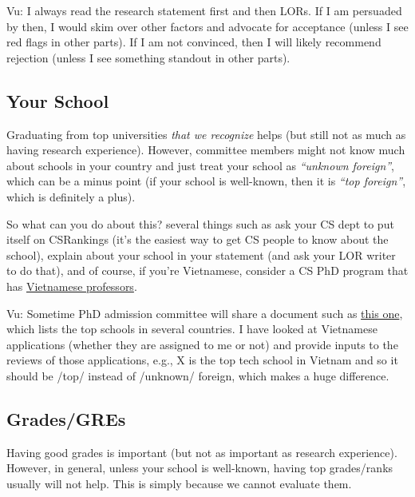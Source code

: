 \documentclass[10pt]{article}
\begin{document}
\begin{tcolorbox}[left=1pt,right=1pt,top=1pt,bottom=1pt]
Vu: I always read the research statement first and then LORs. If I am
persuaded by then, I would skim over other factors and advocate for
acceptance (unless I see red flags in other parts). If I am not
convinced, then I will likely recommend rejection (unless I see
something standout in other parts).
\end{tcolorbox}


\subsection{Your School}\label{sec:your-school}

Graduating from top universities \emph{that we recognize} helps (but still not as much as having research experience).
However, committee members might not know much about schools in your country and just treat your school as
\emph{``unknown foreign''}, which can be a minus point (if your school is well-known, then it is \emph{``top foreign''}, which is definitely a plus).

So what can you do about this? several things such as ask your CS dept to put itself on CSRankings (it's the easiest way to get CS people to know about the school), explain about your school in your statement (and ask your LOR writer to do that), and of course, if you're Vietnamese, consider a CS PhD program that has \href{https://github.com/dynaroars/dynaroars.github.io/wiki/Viet-CS-Profs-US}{Vietnamese professors}.

\begin{tcolorbox}[left=1pt,right=1pt,top=1pt,bottom=1pt]
Vu: Sometime PhD admission committee will share a document such as \href{https://github.com/dynaroars/dynaroars.github.io/wiki/Foreign-Top-Schools}{this one}, which lists the top schools in several countries. I have looked at Vietnamese applications (whether they are assigned to me or not) and provide inputs to the reviews of those applications, e.g., X is the top tech school in Vietnam and so it should be /top/ instead of /unknown/ foreign, which makes a huge difference.
\end{tcolorbox}

\subsection{Grades/GREs}\label{sec:grades}
Having good grades is important (but not as important as research experience).
However, in general, unless your school is well-known, having top grades/ranks
usually will not help. This is simply because we cannot evaluate them.
\end{document}
